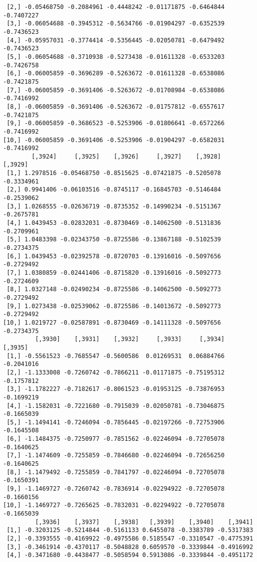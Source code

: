 \documentclass[
  letterpaper,
  DIV=11,
  numbers=noendperiod]{scrreprt}
\begin{document}
\begin{verbatim}
 [2,] -0.05468750 -0.2084961 -0.4448242 -0.01171875 -0.6464844 -0.7407227
 [3,] -0.06054688 -0.3945312 -0.5634766 -0.01904297 -0.6352539 -0.7436523
 [4,] -0.05957031 -0.3774414 -0.5356445 -0.02050781 -0.6479492 -0.7436523
 [5,] -0.06054688 -0.3710938 -0.5273438 -0.01611328 -0.6533203 -0.7426758
 [6,] -0.06005859 -0.3696289 -0.5263672 -0.01611328 -0.6538086 -0.7421875
 [7,] -0.06005859 -0.3691406 -0.5263672 -0.01708984 -0.6538086 -0.7416992
 [8,] -0.06005859 -0.3691406 -0.5263672 -0.01757812 -0.6557617 -0.7421875
 [9,] -0.06005859 -0.3686523 -0.5253906 -0.01806641 -0.6572266 -0.7416992
[10,] -0.06005859 -0.3691406 -0.5253906 -0.01904297 -0.6582031 -0.7416992
        [,3924]     [,3925]    [,3926]     [,3927]    [,3928]    [,3929]
 [1,] 1.2978516 -0.05468750 -0.8515625 -0.07421875 -0.5205078 -0.3334961
 [2,] 0.9941406 -0.06103516 -0.8745117 -0.16845703 -0.5146484 -0.2539062
 [3,] 1.0268555 -0.02636719 -0.8735352 -0.14990234 -0.5151367 -0.2675781
 [4,] 1.0439453 -0.02832031 -0.8730469 -0.14062500 -0.5131836 -0.2709961
 [5,] 1.0483398 -0.02343750 -0.8725586 -0.13867188 -0.5102539 -0.2734375
 [6,] 1.0439453 -0.02392578 -0.8720703 -0.13916016 -0.5097656 -0.2729492
 [7,] 1.0380859 -0.02441406 -0.8715820 -0.13916016 -0.5092773 -0.2724609
 [8,] 1.0327148 -0.02490234 -0.8725586 -0.14062500 -0.5092773 -0.2729492
 [9,] 1.0273438 -0.02539062 -0.8725586 -0.14013672 -0.5092773 -0.2729492
[10,] 1.0219727 -0.02587891 -0.8730469 -0.14111328 -0.5097656 -0.2734375
         [,3930]    [,3931]    [,3932]     [,3933]     [,3934]    [,3935]
 [1,] -0.5561523 -0.7685547 -0.5600586  0.01269531  0.06884766 -0.2041016
 [2,] -1.1333008 -0.7260742 -0.7866211 -0.01171875 -0.75195312 -0.1757812
 [3,] -1.1782227 -0.7182617 -0.8061523 -0.01953125 -0.73876953 -0.1699219
 [4,] -1.1582031 -0.7221680 -0.7915039 -0.02050781 -0.73046875 -0.1665039
 [5,] -1.1494141 -0.7246094 -0.7856445 -0.02197266 -0.72753906 -0.1645508
 [6,] -1.1484375 -0.7250977 -0.7851562 -0.02246094 -0.72705078 -0.1640625
 [7,] -1.1474609 -0.7255859 -0.7846680 -0.02246094 -0.72656250 -0.1640625
 [8,] -1.1479492 -0.7255859 -0.7841797 -0.02246094 -0.72705078 -0.1650391
 [9,] -1.1469727 -0.7260742 -0.7836914 -0.02294922 -0.72705078 -0.1660156
[10,] -1.1469727 -0.7265625 -0.7832031 -0.02294922 -0.72705078 -0.1665039
         [,3936]    [,3937]    [,3938]   [,3939]    [,3940]    [,3941]
 [1,] -0.3203125 -0.5214844 -0.5161133 0.6455078 -0.3383789 -0.5317383
 [2,] -0.3393555 -0.4169922 -0.4975586 0.5185547 -0.3310547 -0.4775391
 [3,] -0.3461914 -0.4370117 -0.5048828 0.6059570 -0.3339844 -0.4916992
 [4,] -0.3471680 -0.4438477 -0.5058594 0.5913086 -0.3339844 -0.4951172

\end{verbatim}
\end{document}
